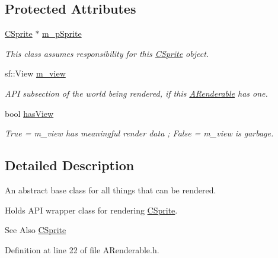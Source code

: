 \subsection*{Protected Attributes}
\begin{DoxyCompactItemize}
\item 
\hyperlink{classCSprite}{C\-Sprite} $\ast$ \hyperlink{classARenderable_a6030df923c81b400e94ff1f6a9df41f8}{m\-\_\-p\-Sprite}
\begin{DoxyCompactList}\small\item\em This class assumes responsibility for this \hyperlink{classCSprite}{C\-Sprite} object. \end{DoxyCompactList}\item 
sf\-::\-View \hyperlink{classARenderable_a9385344aed3d507e828e5b20c8846f4a}{m\-\_\-view}
\begin{DoxyCompactList}\small\item\em A\-P\-I subsection of the world being rendered, if this \hyperlink{classARenderable}{A\-Renderable} has one. \end{DoxyCompactList}\item 
bool \hyperlink{classARenderable_a7975927d5e1b3cffb6b51b8e058fcb51}{has\-View}
\begin{DoxyCompactList}\small\item\em True = m\-\_\-view has meaningful render data ; False = m\-\_\-view is garbage. \end{DoxyCompactList}\end{DoxyCompactItemize}


\subsection{Detailed Description}
An abstract base class for all things that can be rendered. 

Holds A\-P\-I wrapper class for rendering \hyperlink{classCSprite}{C\-Sprite}.

\begin{DoxySeeAlso}{See Also}
\hyperlink{classCSprite}{C\-Sprite} 
\end{DoxySeeAlso}


Definition at line 22 of file A\-Renderable.\-h.



